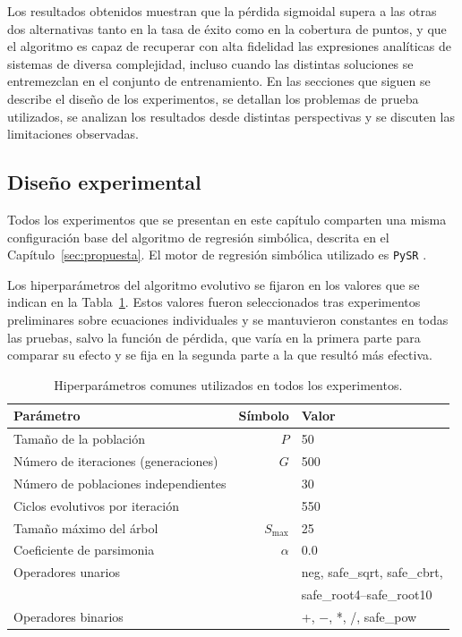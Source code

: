 \documentclass[12pt,a4paper]{article} \usepackage[utf8]{inputenc} \usepackage[spanish]{babel} \usepackage{amsmath, amssymb, amsthm} \usepackage{bm} \usepackage{float} \usepackage{longtable} \usepackage[hidelinks]{hyperref}
\begin{document}
Los resultados obtenidos muestran que la pérdida sigmoidal supera a las otras dos alternativas tanto en la tasa de éxito como en la cobertura de puntos, y que el algoritmo es capaz de recuperar con alta fidelidad las expresiones analíticas de sistemas de diversa complejidad, incluso cuando las distintas soluciones se entremezclan en el conjunto de entrenamiento. En las secciones que siguen se describe el diseño de los experimentos, se detallan los problemas de prueba utilizados, se analizan los resultados desde distintas perspectivas y se discuten las limitaciones observadas.

\subsection{Diseño experimental}
\label{sec:diseno_comun}

Todos los experimentos que se presentan en este capítulo comparten una misma configuración base del algoritmo de regresión simbólica, descrita en el Capítulo~\ref{sec:propuesta}. El motor de regresión simbólica utilizado es \texttt{PySR} \cite{cranmer2023pysr}.

Los hiperparámetros del algoritmo evolutivo se fijaron en los valores que se indican en la Tabla~\ref{tab:hiperparams}. Estos valores fueron seleccionados tras experimentos preliminares sobre ecuaciones individuales y se mantuvieron constantes en todas las pruebas, salvo la función de pérdida, que varía en la primera parte para comparar su efecto y se fija en la segunda parte a la que resultó más efectiva.

\begin{table}[H]
\centering \caption{Hiperparámetros comunes utilizados en todos los experimentos.} \label{tab:hiperparams}
\begin{tabular}{lrl}
\hline Parámetro & Símbolo & Valor \\
\hline Tamaño de la población & $P$ & 50 \\
Número de iteraciones (generaciones) & $G$ & 500 \\
Número de poblaciones independientes & & 30 \\
Ciclos evolutivos por iteración & & 550 \\
Tamaño máximo del árbol & $S_{\max}$ & 25 \\
Coeficiente de parsimonia & $\alpha$ & 0.0 \\
Operadores unarios & & neg, safe\_sqrt, safe\_cbrt, \\
 & & safe\_root4--safe\_root10 \\
Operadores binarios & & +, $-$, *, /, safe\_pow \\
\hline
\end{tabular}
\end{table}
\end{document}
